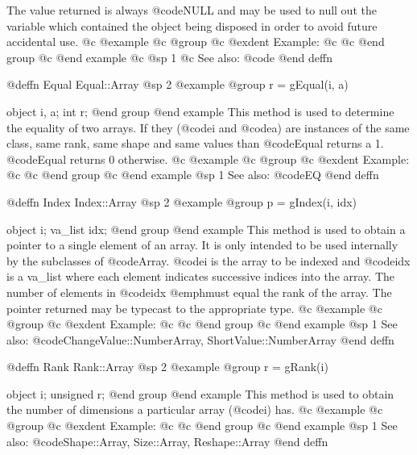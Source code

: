 The value returned is always @code{NULL} and may be used to null out
the variable which contained the object being disposed in order to
avoid future accidental use.
@c @example
@c @group
@c @exdent Example:
@c 
@c @end group
@c @end example
@c @sp 1
@c See also:  @code{}
@end deffn





@deffn {Equal} Equal::Array
@sp 2
@example
@group
r = gEqual(i, a)

object  i, a;
int     r;
@end group
@end example
This method is used to determine the equality of two arrays.  If they
(@code{i} and @code{a}) are instances of the same class, same rank,
same shape and same values than @code{Equal} returns a 1.  @code{Equal}
returns 0 otherwise.
@c @example
@c @group
@c @exdent Example:
@c 
@c @end group
@c @end example
@sp 1
See also:  @code{EQ}
@end deffn








@deffn {Index} Index::Array
@sp 2
@example
@group
p = gIndex(i, idx)

object     i;
va_list  idx;
@end group
@end example
This method is used to obtain a pointer to a single element of an array.
It is only intended to be used internally by the subclasses of
@code{Array}.  @code{i} is the array to be indexed and @code{idx} is a
va_list where each element indicates successive indices into the
array.  The number of elements in @code{idx} @emph{must} equal the rank
of the array.  The pointer returned may be typecast to the appropriate
type.
@c @example
@c @group
@c @exdent Example:
@c 
@c @end group
@c @end example
@sp 1
See also:  @code{ChangeValue::NumberArray, ShortValue::NumberArray}
@end deffn








@deffn {Rank} Rank::Array
@sp 2
@example
@group
r = gRank(i)

object    i;
unsigned  r;
@end group
@end example
This method is used to obtain the number of dimensions a particular
array (@code{i}) has.
@c @example
@c @group
@c @exdent Example:
@c 
@c @end group
@c @end example
@sp 1
See also:  @code{Shape::Array, Size::Array, Reshape::Array}
@end deffn












